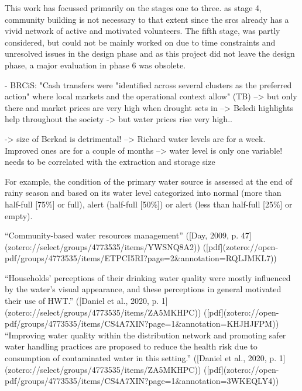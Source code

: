 This work has focussed primarily on the stages one to three. as stage 4, community building is not necessary to that extent since the \acrshort*{srcs} already has a vivid network of active and motivated volunteers. The fifth stage, was partly considered, but could not be mainly worked on due to time constraints and unresolved issues in the design phase and as this project did not leave the design phase, a major evaluation in phase 6 was obsolete. %

- BRCiS: "Cash transfers were "identified across several clusters as the preferred action" where local markets and the operational context allow" (TB) --> but only there and market prices are very high when drought sets in
--> Beledi highlights help throughout the society -> but water prices rise very high.. 

-> size of Berkad is detrimental! --> Richard water levels are for a week. Improved ones are for a couple of months --> water level is only one variable! needs to be correlated with the extraction and storage size

For example, the condition of the primary water source is assessed at the end of rainy season and based on its water level categorized into normal (more than half-full [75\%] or full), alert (half-full [50\%]) or alert (less than half-full [25\%] or empty).

“Community-based water resources management” ([Day, 2009, p. 47](zotero://select/groups/4773535/items/YWSNQ8A2)) ([pdf](zotero://open-pdf/groups/4773535/items/ETPCI5RI?page=2&annotation=RQLJMKL7))

“Households’ perceptions of their drinking water quality were mostly influenced by the water’s visual appearance, and these perceptions in general motivated their use of HWT.” ([Daniel et al., 2020, p. 1](zotero://select/groups/4773535/items/ZA5MKHPC)) ([pdf](zotero://open-pdf/groups/4773535/items/CS4A7XIN?page=1&annotation=KHJHJFPM))
“Improving water quality within the distribution network and promoting safer water handling practices are proposed to reduce the health risk due to consumption of contaminated water in this setting.” ([Daniel et al., 2020, p. 1](zotero://select/groups/4773535/items/ZA5MKHPC)) ([pdf](zotero://open-pdf/groups/4773535/items/CS4A7XIN?page=1&annotation=3WKEQLY4))

